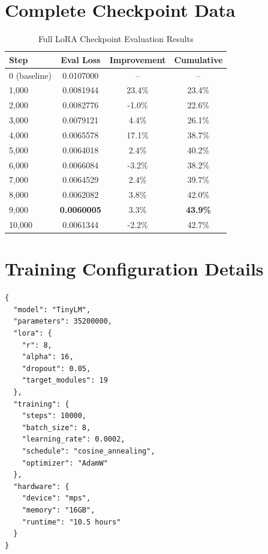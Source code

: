 \documentclass[11pt,a4paper]{article}
\theoremstyle{plain}
\theoremstyle{definition}
\begin{document}
\appendix

\section{Complete Checkpoint Data}
\label{app:checkpoints}

\begin{table}[H]
\centering
\caption{Full LoRA Checkpoint Evaluation Results}
\begin{tabular}{lccc}
\toprule
\textbf{Step} & \textbf{Eval Loss} & \textbf{Improvement} & \textbf{Cumulative} \\
\midrule
0 (baseline) & 0.0107000 & -- & -- \\
1,000 & 0.0081944 & 23.4\% & 23.4\% \\
2,000 & 0.0082776 & -1.0\% & 22.6\% \\
3,000 & 0.0079121 & 4.4\% & 26.1\% \\
4,000 & 0.0065578 & 17.1\% & 38.7\% \\
5,000 & 0.0064018 & 2.4\% & 40.2\% \\
6,000 & 0.0066084 & -3.2\% & 38.2\% \\
7,000 & 0.0064529 & 2.4\% & 39.7\% \\
8,000 & 0.0062082 & 3.8\% & 42.0\% \\
9,000 & \textbf{0.0060005} & 3.3\% & \textbf{43.9\%} \\
10,000 & 0.0061344 & -2.2\% & 42.7\% \\
\bottomrule
\end{tabular}
\end{table}

\section{Training Configuration Details}
\label{app:config}

\begin{lstlisting}[caption=Complete Training Configuration]
{
  "model": "TinyLM",
  "parameters": 35200000,
  "lora": {
    "r": 8,
    "alpha": 16,
    "dropout": 0.05,
    "target_modules": 19
  },
  "training": {
    "steps": 10000,
    "batch_size": 8,
    "learning_rate": 0.0002,
    "schedule": "cosine_annealing",
    "optimizer": "AdamW"
  },
  "hardware": {
    "device": "mps",
    "memory": "16GB",
    "runtime": "10.5 hours"
  }
}
\end{lstlisting}
\end{document}
